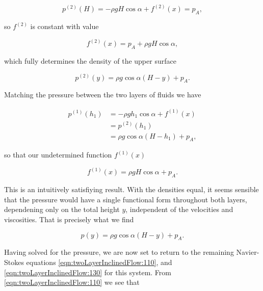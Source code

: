 \begin{equation}\label{eqn:twoLayerInclinedFlow:275}
p^{(2)}(H) = - \rho g H \cos\alpha + f^{(2)}(x) = p_A,
\end{equation}

so $f^{(2)}$ is constant with value

\begin{equation}\label{eqn:twoLayerInclinedFlow:295}
f^{(2)}(x) = p_A + \rho g H \cos\alpha,
\end{equation}

which fully determines the density of the upper surface

\begin{equation}\label{eqn:twoLayerInclinedFlow:315}
p^{(2)}(y) = \rho g \cos\alpha (H - y) + p_A.
\end{equation}

Matching the pressure between the two layers of fluids we have

\begin{align*}
p^{(1)}(h_1) &= - \rho g h_1 \cos\alpha + f^{(1)}(x) \\
             &= p^{(2)}(h_1) \\
             &= \rho g \cos\alpha (H - h_1) + p_A,
\end{align*}

so that our undetermined function $f^{(1)}(x)$ 

\begin{equation}\label{eqn:twoLayerInclinedFlow:335}
f^{(1)}(x) = \rho g H \cos\alpha  + p_A.
\end{equation}

This is an intuitively satisfiying result.  With the densities equal, it seems sensible that the pressure would have a single functional form throughout both layers, dependening only on the total height $y$, independent of the velocities and viscosities.  That is precisely what we find

\begin{equation}\label{eqn:twoLayerInclinedFlow:355}
p(y) = \rho g \cos\alpha (H - y) + p_A.
\end{equation}

Having solved for the pressure, we are now set to return to the remaining Navier-Stokes equations \ref{eqn:twoLayerInclinedFlow:110}, and \ref{eqn:twoLayerInclinedFlow:130} for this system.  From \ref{eqn:twoLayerInclinedFlow:110} we see that 

\EndArticle
